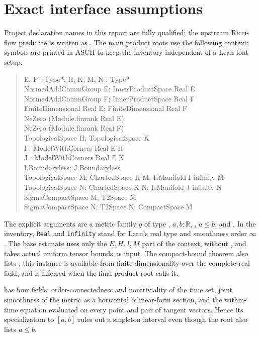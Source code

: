 \documentclass[11pt]{article}
\theoremstyle{remark}\newtheorem{remark}[theorem]{Remark}
\newcommand{\R}{\mathbb R}
\begin{document}
\section{Exact interface assumptions}\label{app:interfaces}
Project declaration names in this report are fully qualified; the upstream
Ricci-flow predicate is written as . The main product
roots use the following context; symbols are printed in ASCII to keep the
inventory independent of a Lean font setup.
\begin{quote}\small\ttfamily
E, F : Type*; H, K, M, N : Type*\\
NormedAddCommGroup E; InnerProductSpace Real E\\
NormedAddCommGroup F; InnerProductSpace Real F\\
FiniteDimensional Real E; FiniteDimensional Real F\\
NeZero (Module.finrank Real E)\\
NeZero (Module.finrank Real F)\\
TopologicalSpace H; TopologicalSpace K\\
I : ModelWithCorners Real E H\\
J : ModelWithCorners Real F K\\
I.Boundaryless; J.Boundaryless\\
TopologicalSpace M; ChartedSpace H M; IsManifold I infinity M\\
TopologicalSpace N; ChartedSpace K N; IsManifold J infinity N\\
SigmaCompactSpace M; T2Space M\\
SigmaCompactSpace N; T2Space N; CompactSpace M
\end{quote}
The explicit arguments are a metric family $g$ of type
,
$a,b:\R$, , $a\le b$, and
. In the inventory, \texttt{Real} and
\texttt{infinity} stand for Lean's real type and smoothness order $\infty$.
The base estimate uses only the $E,H,I,M$ part of the context, without
, and takes actual uniform tensor bounds as input.
The compact-bound theorem also lists ; this instance
is available from finite dimensionality over the complete real field, and is
inferred when the final product root calls it.

 has four fields: order-connectedness and
nontriviality of the time set, joint smoothness of the metric as a horizontal
bilinear-form section, and the within-time equation evaluated on every point
and pair of tangent vectors. Hence its specialization to $[a,b]$ rules out a
singleton interval even though the root also lists $a\le b$.
\end{document}
